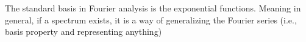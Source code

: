 
\qedhere

The standard basis in Fourier analysis is the exponential functions. 
Meaning in general, if a spectrum exists, it is a way of generalizing the Fourier series (i.e., basis property and representing anything)

